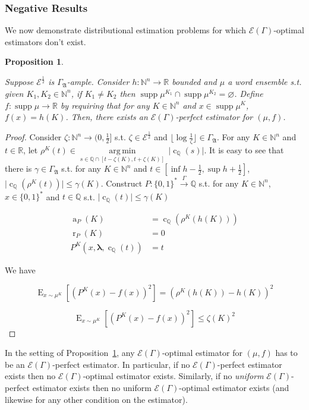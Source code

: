 \documentclass{article}
\numberwithin{equation}{section}
\theoremstyle{definition}
\theoremstyle{plain}
\newtheorem{proposition}{Proposition}[section]
\newcommand{\Bool}{\{0,1\}}
\newcommand{\Words}{{\Bool^*}}
\DeclareMathOperator{\Supp}{supp}
\DeclareMathOperator{\E}{E}
\DeclareMathOperator{\R}{r}
\DeclareMathOperator{\A}{a}
\DeclareMathOperator{\En}{c}
\newcommand{\Argmin}[1]{\underset{#1}{\operatorname{arg\,min}}\,}
\newcommand{\Nats}{\mathbb{N}}
\newcommand{\Rats}{\mathbb{Q}}
\newcommand{\Reals}{\mathbb{R}}
\newcommand{\NatFun}{\Nats^n \rightarrow}
\newcommand{\Estr}{\bm{\lambda}}
\newcommand{\Abs}[1]{\lvert #1 \rvert}
\newcommand{\Floor}[1]{\lfloor #1 \rfloor}
\newcommand{\GrowA}{\Gamma_{\mathfrak{A}}}
\newcommand{\Fall}{\mathcal{E}}
\newcommand{\EG}{\Fall(\Gamma)}
\newcommand{\Scheme}{\xrightarrow{\Gamma}}
\begin{document}
\subsubsection{Negative Results}

We now demonstrate distributional estimation problems for which ${\EG}$-optimal estimators don't exist.

\begin{samepage}
\begin{proposition}
\label{prp:tally_perfect}

Suppose ${\Fall^{\frac{1}{2}}}$ is ${\GrowA}$-ample. Consider ${h: \Nats^n \rightarrow \Reals}$ bounded and ${\mu}$ a word ensemble s.t. given ${K_1, K_2 \in \Nats^n}$, if ${K_1 \ne K_2}$ then ${\Supp \mu^{K_1} \cap \Supp \mu^{K_2} = \varnothing}$. Define ${f: \Supp \mu \rightarrow \Reals}$ by requiring that for any ${K \in \Nats^n}$ and ${x \in \Supp \mu^K}$, ${f(x)=h(K)}$. Then, there exists an ${\EG}$-perfect estimator for ${(\mu,f)}$.

\end{proposition}
\end{samepage}

\begin{proof}

Consider $\zeta: \NatFun (0,\frac{1}{2}]$ s.t.  $\zeta \in \Fall^{\frac{1}{2}}$ and $\Floor{\log \frac{1}{\zeta}} \in \GrowA$. For any $K \in \Nats^n$ and ${t \in \Reals}$, let ${\rho^K(t) \in \Argmin{s \in \Rats \cap [t-\zeta(K),t+\zeta(K)]} \Abs{\En_\Rats(s)}}$. It is easy to see that there is $\gamma \in \GrowA$ s.t. for any ${K \in \Nats^n}$ and $t \in [\inf h - \frac{1}{2}, \sup h + \frac{1}{2}]$, ${\Abs{\En_\Rats(\rho^K(t))} \leq \gamma(K)}$. Construct ${P: \Words \Scheme \Rats}$ s.t. for any ${K \in \Nats^n}$, ${x \in \Words}$ and ${t \in \Rats}$ s.t. ${\Abs{\En_\Rats(t)} \leq \gamma(K)}$ 

\begin{align*}
\A_P(K) &= \En_\Rats(\rho^K(h(K))) \\
\R_P(K) &= 0 \\
P^K(x,\Estr,\En_\Rats(t)) &= t
\end{align*}

We have

\[\E_{x \sim \mu^K}[(P^K(x)-f(x))^2] = (\rho^K(h(K))-h(K))^2\]

\[\E_{x \sim \mu^K}[(P^K(x)-f(x))^2] \leq \zeta(K)^2\]
%
\end{proof}

In the setting of Proposition~\ref{prp:tally_perfect}, any ${\EG}$-optimal estimator for ${(\mu,f)}$ has to be an ${\EG}$-perfect estimator. In particular, if no ${\EG}$-perfect estimator exists then no ${\EG}$-optimal estimator exists. Similarly, if no \emph{uniform} ${\EG}$-perfect estimator exists then no uniform ${\EG}$-optimal estimator exists (and likewise for any other condition on the estimator).
\end{document}
